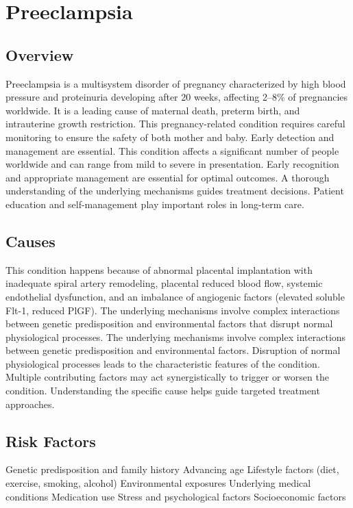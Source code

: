 \chapter{Preeclampsia}
\label{sec:Preeclampsia}

\section{Overview}
Preeclampsia is a multisystem disorder of pregnancy characterized by high blood pressure and proteinuria developing after 20 weeks, affecting 2--8\% of pregnancies worldwide. It is a leading cause of maternal death, preterm birth, and intrauterine growth restriction. This pregnancy-related condition requires careful monitoring to ensure the safety of both mother and baby. Early detection and management are essential. This condition affects a significant number of people worldwide and can range from mild to severe in presentation. Early recognition and appropriate management are essential for optimal outcomes. A thorough understanding of the underlying mechanisms guides treatment decisions. Patient education and self-management play important roles in long-term care.
\section{Causes}
This condition happens because of abnormal placental implantation with inadequate spiral artery remodeling, placental reduced blood flow, systemic endothelial dysfunction, and an imbalance of angiogenic factors (elevated soluble Flt-1, reduced PlGF). The underlying mechanisms involve complex interactions between genetic predisposition and environmental factors that disrupt normal physiological processes. The underlying mechanisms involve complex interactions between genetic predisposition and environmental factors. Disruption of normal physiological processes leads to the characteristic features of the condition. Multiple contributing factors may act synergistically to trigger or worsen the condition. Understanding the specific cause helps guide targeted treatment approaches.
\section{Risk Factors}
Genetic predisposition and family history Advancing age Lifestyle factors (diet, exercise, smoking, alcohol) Environmental exposures Underlying medical conditions Medication use Stress and psychological factors Socioeconomic factors

